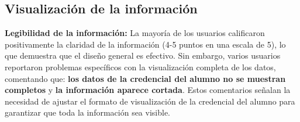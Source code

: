 \subsection{Visualización de la información}
\textbf{Legibilidad de la información:} 
La mayoría de los usuarios calificaron positivamente la claridad de la información (4-5 puntos en una escala de 5), lo que demuestra que el diseño general es efectivo.
Sin embargo, varios usuarios reportaron problemas específicos con la visualización completa de los datos, comentando que: \textbf{los datos de la credencial del alumno no se muestran completos} y \textbf{la información aparece cortada}. Estos comentarios señalan la necesidad de ajustar el formato de visualización de la credencial del alumno para garantizar que toda la información sea visible.